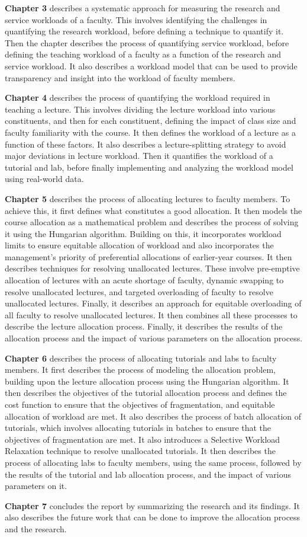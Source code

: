 \textbf{Chapter 3} describes a systematic approach for measuring the research and service workloads of a faculty. This involves identifying the challenges in quantifying the research workload, before defining a technique to quantify it. Then the chapter describes the process of quantifying service workload, before defining the teaching workload of a faculty as a function of the research and service workload. It also describes a workload model that can be used to provide transparency and insight into the workload of faculty members.

\textbf{Chapter 4} describes the process of quantifying the workload required in teaching a lecture. This involves dividing the lecture workload into various constituents, and then for each constituent, defining the impact of class size and faculty familiarity with the course. It then defines the workload of a lecture as a function of these factors. It also describes a lecture-splitting strategy to avoid major deviations in lecture workload. Then it quantifies the workload of a tutorial and lab, before finally implementing and analyzing the workload model using real-world data.

\textbf{Chapter 5} describes the process of allocating lectures to faculty members. To achieve this, it first defines what constitutes a good allocation. It then models the course allocation as a mathematical problem and describes the process of solving it using the Hungarian algorithm. Building on this, it incorporates workload limits to ensure equitable allocation of workload and also incorporates the management's priority of preferential allocations of earlier-year courses. It then describes techniques for resolving unallocated lectures. These involve pre-emptive allocation of lectures with an acute shortage of faculty, dynamic swapping to resolve unallocated lectures, and targeted overloading of faculty to resolve unallocated lectures. Finally, it describes an approach for equitable overloading of all faculty to resolve unallocated lectures. It then combines all these processes to describe the lecture allocation process. Finally, it describes the results of the allocation process and the impact of various parameters on the allocation process.

\textbf{Chapter 6} describes the process of allocating tutorials and labs to faculty members. It first describes the process of modeling the allocation problem, building upon the lecture allocation process using the Hungarian algorithm. It then describes the objectives of the tutorial allocation process and defines the cost function to ensure that the objectives of fragmentation, and equitable allocation of workload are met. It also describes the process of batch allocation of tutorials, which involves allocating tutorials in batches to ensure that the objectives of fragmentation are met. It also introduces a Selective Workload Relaxation technique to resolve unallocated tutorials. It then describes the process of allocating labs to faculty members, using the same process, followed by the results of the tutorial and lab allocation process, and the impact of various parameters on it.

\textbf{Chapter 7} concludes the report by summarizing the research and its findings. It also describes the future work that can be done to improve the allocation process and the research.
